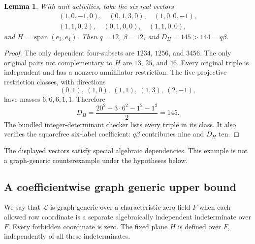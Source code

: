 \documentclass[11pt,a4paper]{article}
\newtheorem{lemma}[theorem]{Lemma}
\theoremstyle{remark}\newtheorem{remark}[theorem]{Remark}
\newcommand{\spn}{\operatorname{span}}     %
\begin{document}
\begin{lemma}\label{mrn:e:ff:lem:counter}
With unit activities, take the six real vectors
\[
 \begin{gathered}
 (1,0,-1,0),\quad(0,1,3,0),\quad(1,0,0,-1),\\
 (1,1,0,2),\quad(0,1,0,0),\quad(1,1,0,0),
 \end{gathered}
\]
and $H=\spn(e_3,e_4)$. Then $q=12$, $\beta=12$, and $D_H=145>144=q\beta$.
\end{lemma}
\begin{proof}
The only dependent four-subsets are $1234$, $1256$, and $3456$. The only original pairs not complementary to $H$ are $13$, $25$, and $46$. Every original triple is independent and has a nonzero annihilator restriction. The five projective restriction classes, with directions
\[
 (0,1),\ (1,0),\ (1,1),\ (1,3),\ (2,-1),
\]
have masses $6,6,6,1,1$. Therefore
\[
 D_H=\frac{20^2-3\cdot6^2-1^2-1^2}{2}=145.
\]
The bundled integer-determinant checker lists every triple in its class. It also verifies the squarefree six-label coefficient: $q\beta$ contributes nine and $D_H$ ten.
\end{proof}
The displayed vectors satisfy special algebraic dependencies. This example is not a graph-generic counterexample under the hypotheses below.

\subsection{A coefficientwise graph generic upper bound}
We say that $\mathcal L$ is graph-generic over a characteristic-zero field $F$ when each allowed row coordinate is a separate algebraically independent indeterminate over $F$. Every forbidden coordinate is zero. The fixed plane $H$ is defined over $F$, independently of all these indeterminates.
\end{document}
